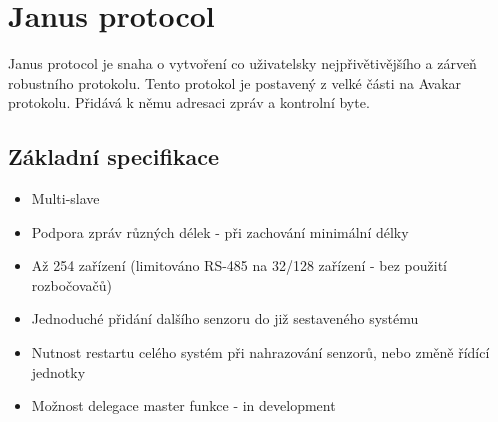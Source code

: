 \chapter{Janus protocol}
Janus protocol je snaha o vytvoření co uživatelsky nejpřivětivějšího a zárveň robustního protokolu.
Tento protokol je postavený z velké části na Avakar protokolu.
Přidává k němu adresaci zpráv a kontrolní byte.

\section{Základní specifikace}
\begin{itemize}
    \item Multi-slave
    \item Podpora zpráv různých délek - při zachování minimální délky
    \item Až 254 zařízení (limitováno RS-485 na 32/128 zařízení - bez použití rozbočovačů)
    \item Jednoduché přidání dalšího senzoru do již sestaveného systému
    \item Nutnost restartu celého systém při nahrazování senzorů, nebo změně řídící jednotky
    \item Možnost delegace master funkce - in development
\end{itemize}